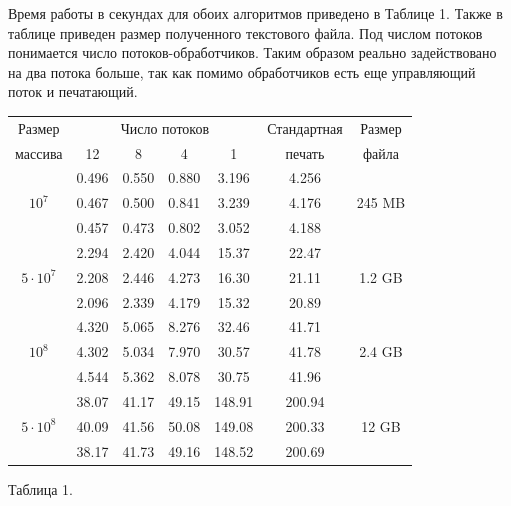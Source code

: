 Время работы в секундах для обоих алгоритмов приведено в Таблице 1.
Также в таблице приведен размер полученного текстового файла.
Под числом потоков понимается число потоков-обработчиков. 
Таким образом реально задействовано на два потока больше, так как помимо обработчиков есть еще управляющий поток и печатающий.
\begin{center}
\begin{longtable}{||c|c|c|c|c|c|c||}
\hline
\hline
Размер & \multicolumn{4}{c|}{Число потоков} & Стандартная & Размер\\
\hhline{~|-|-|-|-|~|~|}
массива & 12 & 8 & 4 & 1 & печать &файла\\
\hline
\hline
 & 0.496 & 0.550 & 0.880 & 3.196 & 4.256 & \\
\hhline{~|-|-|-|-|-|~|}
$10^7$   & 0.467 & 0.500 & 0.841 & 3.239 & 4.176 & 245 MB \\
\hhline{~|-|-|-|-|-|~|}
 & 0.457 & 0.473 & 0.802 & 3.052 & 4.188 &\\
\hline
&2.294 & 2.420 & 4.044 & 15.37 & 22.47 & \\
\hhline{~|-|-|-|-|-|~|}
$5 \cdot 10^7$  & 2.208 & 2.446 & 4.273 & 16.30 & 21.11 &  1.2 GB\\
\hhline{~|-|-|-|-|-|~|}
 & 2.096 & 2.339 & 4.179 & 15.32 & 20.89 & \\
\hline
 & 4.320 & 5.065 & 8.276 & 32.46 & 41.71 & \\
\hhline{~|-|-|-|-|-|~|}
$10^8$  & 4.302 & 5.034 & 7.970 & 30.57 & 41.78 & 2.4 GB\\
\hhline{~|-|-|-|-|-|~|}
& 4.544 & 5.362& 8.078 & 30.75 & 41.96 & \\
\hline
 & 38.07 & 41.17 & 49.15 & 148.91 & 200.94 & \\
\hhline{~|-|-|-|-|-|~|}
$5 \cdot 10^8$ & 40.09 & 41.56 & 50.08 & 149.08 & 200.33 & 12 GB\\
\hhline{~|-|-|-|-|-|~|}
 & 38.17& 41.73& 49.16 & 148.52 & 200.69 & \\
\hline
\hline
\end{longtable}
\small{Таблица 1.}
\end{center}

